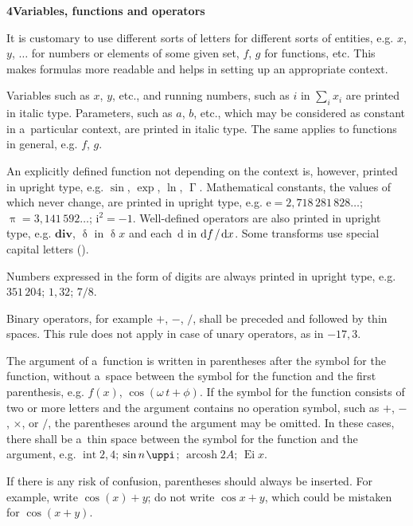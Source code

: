 \documentclass[11pt, a4paper, oneside]{article}
\newlength{\baselinedist}
\newlength{\smalllinespacing}
\renewenvironment{quotation}{%
	\list{}{%
		\baselineskip = \smalllinespacing%
		\leftmargin = \baselineskip%
		\rightmargin = \leftmargin%
		\listparindent = \smalllinespacing%
		\parsep = 0pt%
		\topsep = 0.5\baselinedist plus 3ex
	}%
	\item\relax%
}{%
	\endlist%
}
\newcommand{\dd}{\mathrm{d}}
\newcommand*{\divslash}{%
	\mathbin{%
		\nonscript\mskip-2mu / \nonscript\mskip-2mu%
	}%
}  %
\theoremstyle{Plain}
\theoremstyle{Definition}
\theoremstyle{Remark}
\begin{document}
\begin{quotation}
	\sloppy%
	\textbf{4\quad Variables, functions and operators}\par{}\baselineskip
	\noindent It is customary to use different sorts of letters for different sorts of entities, e.g. $x$, $y$, $\dots$ for numbers or elements of some given set, $f$, $g$ for functions, etc. This makes formulas more readable and helps in setting up an appropriate context. \par
	Variables such as $x$, $y$, etc., and running numbers, such as $i$ in $\sum_i x_i$ are printed in italic type. Parameters, such as $a$, $b$, etc., which may be considered as constant in a~particular context, are printed in italic type. The same applies to functions in general, e.g. $f$, $g$. \par
	An explicitly defined function not depending on the context is, however, printed in upright type, e.g. $\sin$, $\exp$, $\ln$, $\upGamma$. Mathematical constants, the values of which never change, are printed in upright type, e.g. ${\mathrm{e} = 2{,}718\,281\,828\dots}$; ${\uppi = 3{,}141\,592\dots}$; ${\mathrm{i}^2 = -1}$. Well-defined operators are also printed in upright type, e.g. $\mathbf{div}$, $\updelta$ in $\updelta x$ and each~$\dd$ in ${\dd f \divslash \dd x}$. Some transforms use special capital letters (\textellipsis\!). \par
	Numbers expressed in the form of digits are always printed in upright type, e.g. $351\,204$; $1{,}32$; $7/8$. \par
	Binary operators, for example $+$, $-$, $/$, shall be preceded and followed by thin spaces. This rule does not apply in case of unary operators, as in $-17{,}3$. \par
	The argument of a~function is written in parentheses after the symbol for the function, without a~space between the symbol for the function and the first parenthesis, e.g. $f(x)$, ${\cos(\omega\,t + \phi)}$. If the symbol for the function consists of two or more letters and the argument contains no operation symbol, such as $+$, $-$, $\times$, or $/$, the parentheses around the argument may be omitted. In these cases, there shall be a~thin space between the symbol for the function and the argument, e.g. $\operatorname{int} 2{,}4$; $\sin n{\kern 0.1em}\uppi$; $\operatorname{arcosh} 2A$; $\operatorname{Ei} x$. \par
	If there is any risk of confusion, parentheses should always be inserted. For example, write $\cos(x) + y$; do not write $\cos x + y$, which could be mistaken for $\cos(x + y)$. \par

\end{quotation}
\end{document}
